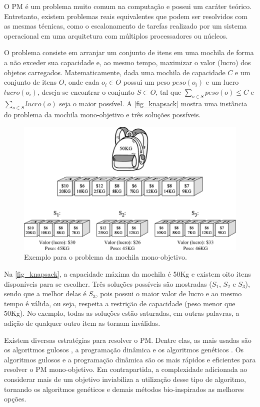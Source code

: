 O \ac{PM} é um problema muito comum na computação e possui um caráter teórico. Entretanto, existem problemas reais equivalentes que podem ser resolvidos com as mesmas técnicas, como o escalonamento de tarefas realizado por um sistema operacional em uma arquitetura com múltiplos processadores ou núcleos.

O problema consiste em arranjar um conjunto de itens em uma mochila de forma a não exceder sua capacidade e, ao mesmo tempo, maximizar o valor (lucro) dos objetos carregados. Matematicamente, dada uma mochila de capacidade $C$ e um conjunto de itens $O$, onde cada $o_i \in O$ possui um peso $peso(o_i)$ e um lucro $lucro(o_i)$, deseja-se encontrar o conjunto $S \subset O$, tal que $\sum_{o \in S} peso(o) \leq C$ e $\sum_{o \in S} lucro(o)$ seja o maior possível. A \autoref{fig_knapsack} mostra uma instância do problema da mochila mono-objetivo e três soluções possíveis.

\begin{figure}[!htbp]
	\centering
	\includegraphics[width=1\textwidth]{cap_problemas/figs/mochila.png}
	\caption{\label{fig_knapsack}Exemplo para o problema da mochila mono-objetivo.}
\end{figure}

Na \autoref{fig_knapsack}, a capacidade máxima da mochila é 50Kg e existem oito itens disponíveis para se escolher. Três soluções possíveis são mostradas ($S_1$, $S_2$ e $S_3$), sendo que a melhor delas é $S_3$, pois possui o maior valor de lucro e ao mesmo tempo é válida, ou seja, respeita a restrição de capacidade (peso menor que 50Kg). No exemplo, todas as soluções estão saturadas, em outras palavras, a adição de qualquer outro item as tornam inválidas.

Existem diversas estratégias para resolver o \ac{PM}. Dentre elas, as mais usadas são os algoritmos gulosos \cite{KnapsackGreedy}, a programação dinâmica \cite{KnapsackDynamic} e os algoritmos genéticos \cite{KnapsackGA}. Os algoritmos gulosos e a programação dinâmica são os mais rápidos e eficientes para resolver o PM mono-objetivo. Em contrapartida, a complexidade adicionada ao considerar mais de um objetivo inviabiliza a utilização desse tipo de algoritmo, tornando os algoritmos genéticos e demais métodos bio-inspirados as melhores opções.

